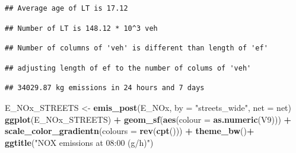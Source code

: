 \documentclass[12pt,graybox,envcountchap,sectrefs]{krantz}
\makeatletter
\newenvironment{Shaded}{\begin{snugshade}}{\end{snugshade}}
\newcommand{\KeywordTok}[1]{\textcolor[rgb]{0.13,0.29,0.53}{\textbf{#1}}}
\newcommand{\DataTypeTok}[1]{\textcolor[rgb]{0.13,0.29,0.53}{#1}}
\newcommand{\DecValTok}[1]{\textcolor[rgb]{0.00,0.00,0.81}{#1}}
\newcommand{\StringTok}[1]{\textcolor[rgb]{0.31,0.60,0.02}{#1}}
\newcommand{\OperatorTok}[1]{\textcolor[rgb]{0.81,0.36,0.00}{\textbf{#1}}}
\newcommand{\NormalTok}[1]{#1}
\newenvironment{kframe}{%
\medskip{}
\setlength{\fboxsep}{.8em}
 \def\at@end@of@kframe{}%
 \ifinner\ifhmode%
  \def\at@end@of@kframe{\end{minipage}}%
  \begin{minipage}{\columnwidth}%
 \fi\fi%
 \def\FrameCommand##1{\hskip\@totalleftmargin \hskip-\fboxsep
 \colorbox{shadecolor}{##1}\hskip-\fboxsep
     \hskip-\linewidth \hskip-\@totalleftmargin \hskip\columnwidth}%
 \MakeFramed {\advance\hsize-\width
   \@totalleftmargin\z@ \linewidth\hsize
   \@setminipage}}%
 {\par\unskip\endMakeFramed%
 \at@end@of@kframe}
\renewenvironment{Shaded}{\begin{kframe}}{\end{kframe}}
\theoremstyle{definition}
\theoremstyle{definition}
\theoremstyle{definition}
\theoremstyle{remark}
\makeatother
\begin{document}
\begin{verbatim}
## Average age of LT is 17.12
\end{verbatim}

\begin{verbatim}
## Number of LT is 148.12 * 10^3 veh
\end{verbatim}

\begin{Shaded}
\end{Shaded}

\begin{verbatim}
## Number of columns of 'veh' is different than length of 'ef'
\end{verbatim}

\begin{verbatim}
## adjusting length of ef to the number of colums of 'veh'
\end{verbatim}

\begin{verbatim}
## 34029.87 kg emissions in 24 hours and 7 days
\end{verbatim}

\begin{Shaded}
\begin{Highlighting}[]
\NormalTok{E_NOx_STREETS <-}\StringTok{ }\KeywordTok{emis_post}\NormalTok{(E_NOx, }\DataTypeTok{by =} \StringTok{"streets_wide"}\NormalTok{, }\DataTypeTok{net =}\NormalTok{ net)}
\KeywordTok{ggplot}\NormalTok{(E_NOx_STREETS) }\OperatorTok{+}\StringTok{ }\KeywordTok{geom_sf}\NormalTok{(}\KeywordTok{aes}\NormalTok{(}\DataTypeTok{colour =} \KeywordTok{as.numeric}\NormalTok{(V9))) }\OperatorTok{+}
\StringTok{  }\KeywordTok{scale_color_gradientn}\NormalTok{(}\DataTypeTok{colours =} \KeywordTok{rev}\NormalTok{(}\KeywordTok{cpt}\NormalTok{())) }\OperatorTok{+}\StringTok{ }\KeywordTok{theme_bw}\NormalTok{()}\OperatorTok{+}
\StringTok{  }\KeywordTok{ggtitle}\NormalTok{(}\StringTok{"NOX emissions at 08:00 (g/h)"}\NormalTok{)}
\end{Highlighting}
\end{Shaded}
\end{document}
